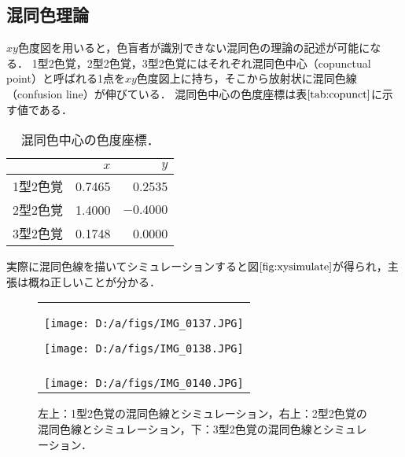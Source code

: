 \documentclass[uplatex,paper=a4,fontsize=4.0truemm,jafontsize=4.0truemm,head_space=30.0truemm,foot_space=30.0truemm,baselineskip=8.0truemm,line_length=40zw,gutter=25.0truemm,oneside,openany,fleqn,hanging_panctuation,open_bracket_pos=nibu_tentsuki,dvipdfmx,jis2004,book,titlepage]{jlreq}
\theoremstyle{mystyle}
\newcommand{\captiondot}[1]{\caption{#1．}}
\newcommand{\tableinput}[4]{\begin{table}[btp]\centering\captiondot{#3}\label{tab:#4}\begin{tabular}{#1}#2\end{tabular}\end{table}}
\newcommand{\mathdisplaystyle}[1]{\(\displaystyle{#1}\)}
\newcommand{\Reference}[1]{\mathdisplaystyle{\ref{#1}}}
\newcommand{\negativevalue}[1]{{-#1}}
\begin{document}
			\subsection{混同色理論}
				\mathdisplaystyle{xy}色度図を用いると，色盲者が識別できない混同色の理論の記述が可能になる．
				1型2色覚，2型2色覚，3型2色覚にはそれぞれ混同色中心（copunctual point）と呼ばれる1点を\mathdisplaystyle{xy}色度図上に持ち，そこから放射状に混同色線（confusion line）が伸びている．
				混同色中心の色度座標は表\Reference{tab:copunct}に示す値である\cite[Table 1]{Fomins2011}．
				\tableinput{l|rr}{ & \(x\) & \(y\) \\ \hline
					1型2色覚 & 0.7465 & 0.2535 \\
					2型2色覚 & 1.4000 & \mathdisplaystyle{\negativevalue{0.4000}} \\
					3型2色覚 & 0.1748 & 0.0000}{混同色中心の色度座標}{copunct}
				実際に混同色線を描いてシミュレーションすると図\Reference{fig:xysimulate}が得られ，主張は概ね正しいことが分かる．
				\begin{figure}[tbp]
					\centering
					\begin{tabular}{c}
						\begin{minipage}{0.5\linewidth}
							\centering
							\texttt{[image: D:/a/figs/IMG\_0137.JPG]}
						\end{minipage}
						\begin{minipage}{0.5\linewidth}
							\centering
							\texttt{[image: D:/a/figs/IMG\_0138.JPG]}
						\end{minipage} \\
						\begin{minipage}{0.06\linewidth}
							\vspace{10truemm}
						\end{minipage} \\
						\begin{minipage}{0.5\linewidth}
							\centering
							\texttt{[image: D:/a/figs/IMG\_0140.JPG]}
						\end{minipage}
						\begin{minipage}{0.5\linewidth}
							\vspace{10truemm}
						\end{minipage}
					\end{tabular}
					\captiondot{左上：1型2色覚の混同色線とシミュレーション，右上：2型2色覚の混同色線とシミュレーション，下：3型2色覚の混同色線とシミュレーション}\label{fig:xysimulate}
				\end{figure}
\end{document}
